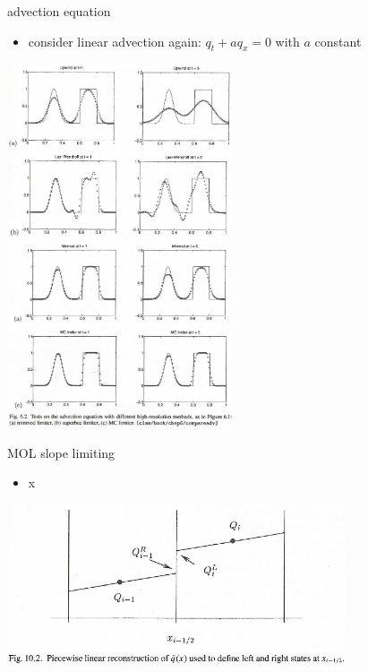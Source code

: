 \documentclass[10pt,hyperref]{beamer}
\begin{document}
\begin{frame}{advection equation}

\begin{itemize}
\item consider linear advection again: $q_t + a q_x=0$ with $a$ constant
\end{itemize}

\mbox{\includegraphics[width=0.5\textwidth]{figs/leveque6p1} \, \includegraphics[width=0.5\textwidth]{figs/leveque6p2}}
\end{frame}


\begin{frame}{MOL slope limiting}

\begin{itemize}
\item x
\end{itemize}

\hfill \includegraphics[width=0.75\textwidth]{figs/leveque10p2}
\end{frame}
\end{document}
